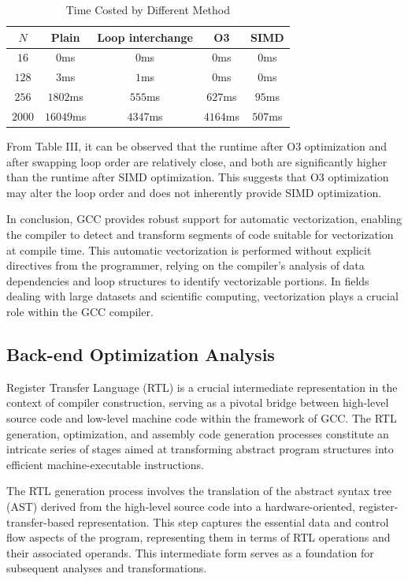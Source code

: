 \documentclass[conference]{IEEEtran}
\begin{document}
\begin{table}
	\caption{Time Costed by Different Method}
	\begin{center}
		\begin{tabular}{c c c c c}
			\toprule
			$N$ &Plain&Loop interchange & O3 & SIMD\\
			\hline
			$16$ & $0$ms & $0$ms & $0$ms & $0$ms\\
			$128$& $3$ms& $1$ms& $0$ms& $0$ms\\
			$256$& $1802$ms& $555$ms& $627$ms& $95$ms\\
			$2000$& $16049$ms& $4347$ms& $4164$ms& $507$ms\\
			\bottomrule
		\end{tabular}
	\end{center}
\end{table}

From Table III, it can be observed that the runtime after O3 optimization and after swapping loop order are relatively close, and both are significantly higher than the runtime after SIMD optimization. This suggests that O3 optimization may alter the loop order and does not inherently provide SIMD optimization.

In conclusion, GCC provides robust support for automatic vectorization, enabling the compiler to detect and transform segments of code suitable for vectorization at compile time. This automatic vectorization is performed without explicit directives from the programmer, relying on the compiler's analysis of data dependencies and loop structures to identify vectorizable portions. In fields dealing with large datasets and scientific computing, vectorization plays a crucial role within the GCC compiler.

\subsection{Back-end Optimization Analysis}

Register Transfer Language (RTL) is a crucial intermediate representation in the context of compiler construction, serving as a pivotal bridge between high-level source code and low-level machine code within the framework of GCC. The RTL generation, optimization, and assembly code generation processes constitute an intricate series of stages aimed at transforming abstract program structures into efficient machine-executable instructions.

The RTL generation process involves the translation of the abstract syntax tree (AST) derived from the high-level source code into a hardware-oriented, register-transfer-based representation. This step captures the essential data and control flow aspects of the program, representing them in terms of RTL operations and their associated operands. This intermediate form serves as a foundation for subsequent analyses and transformations.
\end{document}
